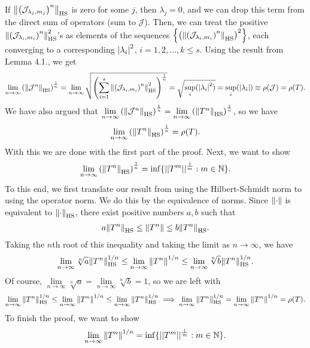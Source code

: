 \documentclass[11pt]{article}
\begin{document}
If $\norm{\left(\mathcal{J}_{\lambda_j,m_j}\right)^n}_\text{HS}$ is zero for some $j$, then  $\lambda_j = 0$, and  we can drop this term from the direct sum of operators (sum to $\mathcal{J}$). Then, we can treat the positive $\norm{\left(\mathcal{J}_{\lambda_i,m_i}\right)^n}_\text{HS}^2$'s as elements of the sequences $\left\{ \left(\norm{\left(\mathcal{J}_{\lambda_i,m_i}\right)^n}_\text{HS}\right)^2\right\}$, each converging to a corresponding $\abs{\lambda_i}^2$, $i=1,2,\dots,k \leq s$. Using the result from Lemma 4.1., we get
\begin{align*}
\lim\limits_{n\to\infty}\left( \norm{\mathcal{J}^n}_\text{HS} \right)^{\frac{1}{n}}
= \lim\limits_{n\to\infty}\sqrt{ \left( \sum^{s}_{i=1} \norm{ \left( \mathcal{J}_{\lambda_i, m_i}\right)^n}_\text{HS}^2 \right)^\frac{1}{n}}= \sqrt{\sup_{i}(\abs{\lambda_i}^2)}= \sup_{i}(\abs{\lambda_i}) \equiv \rho(\mathcal{J}) = \rho(T).
\end{align*}
We have also argued that $\lim\limits_{n\to\infty}\left( \norm{\mathcal{J}^n}_\text{HS} \right)^{\frac{1}{n}} = \lim\limits_{n\to\infty}\left( \norm{T^n}_\text{HS} \right)^{\frac{1}{n}}$, so we have
\begin{align*}
\lim\limits_{n\to\infty}\left( \norm{T^n}_\text{HS} \right)^{\frac{1}{n}} = \rho(T).
\end{align*}
With this we are done with the first part of the proof. Next, we want to show 
\begin{align*}
\lim\limits_{n\to\infty}\left( \norm{T^n}_\text{HS} \right)^{\frac{1}{n}} = \inf \{  || T^m || ^\frac{1}{m} : m \in \mathbb{N} \}.
\end{align*}
To this end, we first translate our result from using the Hilbert-Schmidt norm to using the operator norm. We do this by the equivalence of norms. Since $\norm{\cdot}$ is equivalent to $\norm{\cdot}_{\text{HS}}$, there exist positive numbers $a,b$ such that
\begin{align*}
a\norm{T^n}_{\text{HS}} \leq \norm{T^n} \leq b\norm{T^n}_{\text{HS}}.
\end{align*}
Taking the $n$th root of this inequality and taking the limit as $n\to \infty$, we have
\begin{align*}
\lim\limits_{n\to \infty}\sqrt[n]{a}\norm{T^n}_{\text{HS}}^{1/n} \leq \lim\limits_{n\to \infty}\norm{T^n}^{1/n} \leq \lim\limits_{n\to \infty}\sqrt[n]{b}\norm{T^n}_{\text{HS}}^{1/n}.
\end{align*}
Of course, $\lim\limits_{n\to\infty} \sqrt[n]{a} = \lim\limits_{n\to\infty} \sqrt[n]{b} = 1$, so we are left with
\begin{align}\label{eq2}
\lim\limits_{n\to \infty}\norm{T^n}_{\text{HS}}^{1/n} \leq \lim\limits_{n\to \infty}\norm{T^n}^{1/n} \leq \lim\limits_{n\to \infty}\norm{T^n}_{\text{HS}}^{1/n} \implies \lim\limits_{n\to\infty} \norm{T^n}_\text{HS}^{1/n} = \lim\limits_{n\to \infty}\norm{T^n}^{1/n} = \rho(T).
\end{align}
To finish the proof, we want to show
\begin{align*}
\lim\limits_{n\to \infty}\norm{T^n}^{1/n} = \inf \{  || T^m || ^\frac{1}{m} : m \in \mathbb{N} \}.
\end{align*}
\end{document}
